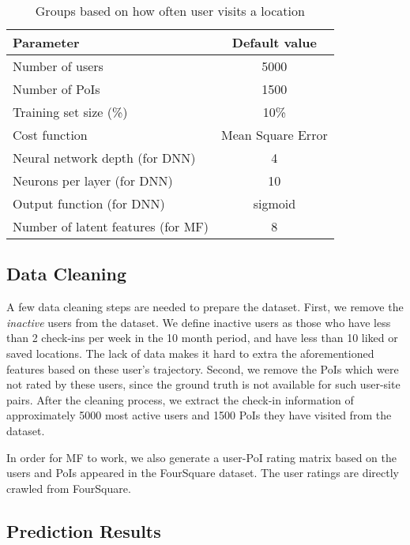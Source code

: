 \begin{table}[htbp]
\begin{center}
\caption{Groups based on how often user visits a location \label{settings}}
\begin{tabular}{|l|c|} \hline
\textbf{Parameter} & \textbf{Default value} \\ \hline
Number of users & 5000  \\ \hline
Number of PoIs & 1500 \\ \hline
Training set size (\%) & 10\% \\ \hline
Cost function & Mean Square Error \\ \hline
Neural network depth (for DNN)& 4 \\ \hline
Neurons per layer (for DNN) & 10 \\ \hline
Output function (for DNN) & sigmoid \\ \hline
Number of latent features (for MF) & 8 \\ \hline
\end{tabular}
\end{center}
\end{table}

\subsection{Data Cleaning}

A few data cleaning steps are needed to prepare the dataset. First, we remove the \textit{inactive} users from the dataset. We define inactive users as those who have less than 2 check-ins per week in the 10 month period, and have less than 10 liked or saved locations. The lack of data makes it hard to extra the aforementioned features based on these user's trajectory. Second, we remove the PoIs which were not rated by these users, since the ground truth is not available for such user-site pairs. After the cleaning process, we extract the check-in information of approximately 5000 most active users and 1500 PoIs they have visited from the dataset.

In order for MF to work, we also generate a user-PoI rating matrix based on the users and PoIs appeared in the FourSquare dataset. The user ratings are directly crawled from FourSquare.


\subsection{Prediction Results}

